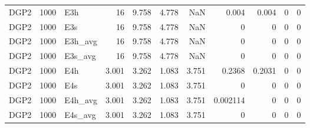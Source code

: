 \begin{table}[!htbp]
\begin{tabular}{lrlrrrrrrrr}
DGP2 & 1000 & E3h & 16 & 9.758 & 4.778 & NaN & 0.004 & 0.004 & 0 & 0 \\
DGP2 & 1000 & E3s & 16 & 9.758 & 4.778 & NaN & 0 & 0 & 0 & 0 \\
DGP2 & 1000 & E3h_avg & 16 & 9.758 & 4.778 & NaN & 0 & 0 & 0 & 0 \\
DGP2 & 1000 & E3s_avg & 16 & 9.758 & 4.778 & NaN & 0 & 0 & 0 & 0 \\
DGP2 & 1000 & E4h & 3.001 & 3.262 & 1.083 & 3.751 & 0.2368 & 0.2031 & 0 & 0 \\
DGP2 & 1000 & E4s & 3.001 & 3.262 & 1.083 & 3.751 & 0 & 0 & 0 & 0 \\
DGP2 & 1000 & E4h_avg & 3.001 & 3.262 & 1.083 & 3.751 & 0.002114 & 0 & 0 & 0 \\
DGP2 & 1000 & E4s_avg & 3.001 & 3.262 & 1.083 & 3.751 & 0 & 0 & 0 & 0 \\
\bottomrule
\end{tabular}

\end{table}
